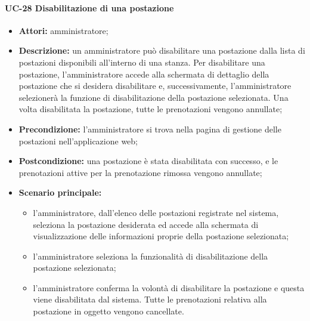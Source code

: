 \paragraph{UC-28 Disabilitazione di una postazione}
\begin{itemize}
    \item \textbf{Attori:} amministratore;
    \item \textbf{Descrizione:} un amministratore pu\`{o} disabilitare una postazione dalla lista di postazioni disponibili all'interno di una stanza. Per disabilitare una postazione, l'amministratore accede alla schermata di dettaglio della postazione che si desidera disabilitare e, successivamente, l'amministratore selezionerà la funzione di disabilitazione della postazione selezionata. Una volta disabilitata la postazione, tutte le prenotazioni vengono annullate;
    \item \textbf{Precondizione:} l'amministratore si trova nella pagina di gestione delle postazioni nell'applicazione web;
    \item \textbf{Postcondizione:} una postazione \`{e} stata disabilitata con successo, e le prenotazioni attive per la prenotazione rimossa vengono annullate;
    \item \textbf{Scenario principale:}
    \begin{itemize}
        \item l'amministratore, dall'elenco delle postazioni registrate nel sistema, seleziona la postazione desiderata ed accede alla schermata di visualizzazione delle informazioni proprie della postazione selezionata;
        \item l'amministratore seleziona la funzionalità di disabilitazione della postazione selezionata;
        \item l'amministratore conferma la volontà di disabilitare la postazione e questa viene disabilitata dal sistema. Tutte le prenotazioni relativa alla postazione in oggetto vengono cancellate.
    \end{itemize}
\end{itemize}

